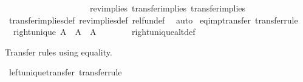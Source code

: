 \begin{isabellebody}
\ \ {\isachardoublequoteopen}{\isacharparenleft}{\kern0pt}{\isacharparenleft}{\kern0pt}{\isacharequal}{\kern0pt}{\isacharparenright}{\kern0pt}\ \ \ \ \ \ \ \ {\isacharequal}{\kern0pt}{\isacharequal}{\kern0pt}{\isacharequal}{\kern0pt}{\isachargreater}{\kern0pt}\ {\isacharparenleft}{\kern0pt}{\isacharequal}{\kern0pt}{\isacharparenright}{\kern0pt}\ \ \ \ \ \ \ \ {\isacharequal}{\kern0pt}{\isacharequal}{\kern0pt}{\isacharequal}{\kern0pt}{\isachargreater}{\kern0pt}\ rev{\isacharunderscore}{\kern0pt}implies{\isacharparenright}{\kern0pt}\ transfer{\isacharunderscore}{\kern0pt}implies\ transfer{\isacharunderscore}{\kern0pt}implies{\isachardoublequoteclose}\isanewline
%
\isadelimproof
\ \ %
\endisadelimproof
%
\isatagproof
{}\isamarkupfalse%
\ transfer{\isacharunderscore}{\kern0pt}implies{\isacharunderscore}{\kern0pt}def\ rev{\isacharunderscore}{\kern0pt}implies{\isacharunderscore}{\kern0pt}def\ rel{\isacharunderscore}{\kern0pt}fun{\isacharunderscore}{\kern0pt}def\ \isamarkupfalse%
\ auto%
\endisatagproof
{\isafoldproof}%
%
\isadelimproof
\isanewline
%
\endisadelimproof
\isanewline
{}\isamarkupfalse%
\ eq{\isacharunderscore}{\kern0pt}imp{\isacharunderscore}{\kern0pt}transfer\ {\isacharbrackleft}{\kern0pt}transfer{\isacharunderscore}{\kern0pt}rule{\isacharbrackright}{\kern0pt}{\isacharcolon}{\kern0pt}\isanewline
\ \ {\isachardoublequoteopen}right{\isacharunderscore}{\kern0pt}unique\ A\ {\isasymLongrightarrow}\ {\isacharparenleft}{\kern0pt}A\ {\isacharequal}{\kern0pt}{\isacharequal}{\kern0pt}{\isacharequal}{\kern0pt}{\isachargreater}{\kern0pt}\ A\ {\isacharequal}{\kern0pt}{\isacharequal}{\kern0pt}{\isacharequal}{\kern0pt}{\isachargreater}{\kern0pt}\ {\isacharparenleft}{\kern0pt}{\isasymlongrightarrow}{\isacharparenright}{\kern0pt}{\isacharparenright}{\kern0pt}\ {\isacharparenleft}{\kern0pt}{\isacharequal}{\kern0pt}{\isacharparenright}{\kern0pt}\ {\isacharparenleft}{\kern0pt}{\isacharequal}{\kern0pt}{\isacharparenright}{\kern0pt}{\isachardoublequoteclose}\isanewline
%
\isadelimproof
\ \ %
\endisadelimproof
%
\isatagproof
{}\isamarkupfalse%
\ right{\isacharunderscore}{\kern0pt}unique{\isacharunderscore}{\kern0pt}alt{\isacharunderscore}{\kern0pt}def{}\ \isacommand{{\isachardot}{\kern0pt}}\isamarkupfalse%
%
\endisatagproof
{\isafoldproof}%
%
\isadelimproof
%
\endisadelimproof
%
\begin{isamarkuptext}%
Transfer rules using equality.%
\end{isamarkuptext}\isamarkuptrue%
\isamarkupfalse%
\ left{\isacharunderscore}{\kern0pt}unique{\isacharunderscore}{\kern0pt}transfer\ {\isacharbrackleft}{\kern0pt}transfer{\isacharunderscore}{\kern0pt}rule{\isacharbrackright}{\kern0pt}{\isacharcolon}{\kern0pt}\isanewline

\end{isabellebody}
